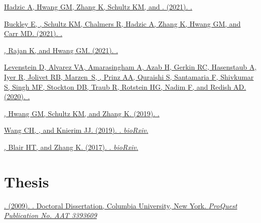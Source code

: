 \begin{description}
  \item \href{https://arxiv.org/abs/2111.00599}{Hadzic A, Hwang GM, Zhang K,
      Schultz KM, and . (2021). .
    }
  \item \href{https://arxiv.org/abs/2109.05545}{Buckley E, ,
      Schultz KM, Chalmers R, Hadzic A, Zhang K, Hwang GM, and Carr MD. (2021).
    . }
  \item \href{https://arxiv.org/abs/2105.07284}
    {, Rajan K, and Hwang GM. (2021). .
    }
  \item \href{https://arxiv.org/abs/2003.13825}
    {Levenstein D, Alvarez VA, Amarasingham A, Azab H, Gerkin RC, Hasenstaub
      A, Iyer R, Jolivet RB, Marzen~S, , Prinz AA, Quraishi
      S, Santamaria F, Shivkumar S, Singh MF, Stockton DB, Traub R, Rotstein
      HG, Nadim F, and Redish AD. (2020). . }
  \item \href{https://arxiv.org/abs/1909.06711}
    {, Hwang GM, Schultz KM, and Zhang K. (2019).
    . }
  \item \href{https://dx.doi.org/10.1101/764282}
    {Wang CH, , and Knierim JJ. (2019). . \emph{bioRxiv}.
    }
  \item \href{https://dx.doi.org/10.1101/211458}
    {, Blair HT, and Zhang K. (2017). . \emph{bioRxiv}. }
\end{description}

\section*{Thesis}

\begin{description}
  \item \href{https://search.proquest.com/docview/304862872/abstract}
    {. (2009). . Doctoral Dissertation, Columbia University, New
    York. \emph{ProQuest Publication No. AAT 3393609}}
\end{description}

